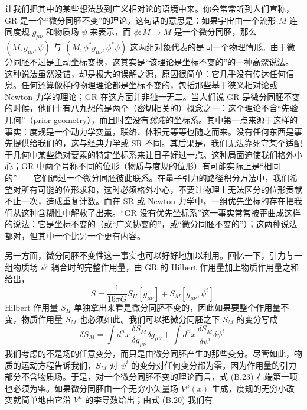 让我们把其中的某些想法放到广义相对论的语境中来。你会常常听到人们宣称，GR 是一个“微分同胚不变”的理论。这句话的意思是：如果宇宙由一个流形 $M$ 连同度规 $g_{\mu\nu}$ 和物质场 $\psi$ 来表示，而 $\phi : M \to M$ 是一个微分同胚，那么 $(M, g_{\mu\nu}, \psi)$ 与 $(M, \phi^* g_{\mu\nu}, \phi^* \psi)$ 这两组对象代表的是同一个物理情形。由于微分同胚不过是主动坐标变换，这其实是“该理论是坐标不变的”的一种高深说法。%
这种说法虽然没错，却是极大的误解之源，原因很简单：它几乎没有传达任何信息。任何还算像样的物理理论都是坐标不变的，包括那些基于狭义相对论或 Newton 力学的理论；GR 在这方面并非独一无二。当人们说 GR 是微分同胚不变的时候，他们十有八九想的是两个（密切相关的）概念之一：这个理论不含“先验几何”（prior geometry），而且时空没有\emph{优先}的坐标系。其中第一点来源于这样的事实：度规是一个动力学变量，联络、体积元等等也随之而来。没有任何东西是事先提供给我们的，这与经典力学或 SR 不同。其后果是，我们无法靠死守某个适配于几何中某些绝对要素的特定坐标系来让日子好过一点。这种局面迫使我们格外小心；GR 中两个号称不同的位形（物质与度规的位形）有可能实际上是“相同的”——它们通过一个微分同胚彼此联系。在量子引力的路径积分方法中，我们希望对所有可能的位形求和，这时必须格外小心，不要让物理上无法区分的位形贡献不止一次，造成重复计数。而在 SR 或 Newton 力学中，一组优先坐标的存在把我们从这种含糊性中解救了出来。“GR 没有优先坐标系”这一事实常常被歪曲成这样的说法：它是坐标不变的（或“广义协变的”，或“微分同胚不变的”）；这两种说法都对，但其中一个比另一个更有内容。

另一方面，微分同胚不变性这一事实也可以好好地加以利用。回忆一下，引力与一组物质场 $\psi^i$ 耦合时的完整作用量，由 GR 的 Hilbert 作用量加上物质作用量之和给出，
\begin{equation*}
S = \frac{1}{16\pi G} S_H[g_{\mu\nu}] + S_M[g_{\mu\nu}, \psi^i].
\tag{B.22}
\end{equation*}
Hilbert 作用量 $S_H$ 单独拿出来看是微分同胚不变的，因此如果要整个作用量不变，物质作用量 $S_M$ 也必须如此。我们可以把微分同胚之下 $S_M$ 的变分写成
\begin{equation*}
\delta S_M = \int d^n x \, \frac{\delta S_M}{\delta g_{\mu\nu}} \delta g_{\mu\nu}
+ \int d^n x \, \frac{\delta S_M}{\delta \psi^i} \delta \psi^i.
\tag{B.23}
\end{equation*}
我们考虑的不是场的任意变分，而只是由微分同胚产生的那些变分。尽管如此，物质的运动方程告诉我们，$S_M$ 对 $\psi^i$ 的变分对任何变分都为零，因为作用量的引力部分不含物质场。于是，对一个微分同胚不变的理论而言，式 (B.23) 右端第一项也必须为零。如果微分同胚由一个无穷小矢量场 $V^\mu(x)$ 生成，度规的无穷小改变就简单地由它沿 $V^\mu$ 的李导数给出；由式 (B.20) 我们有

